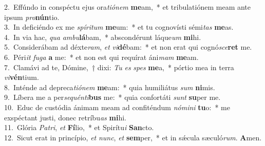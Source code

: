 {2.~}Effúndo in conspéctu ejus ora\textit{ti}\textit{ó}\textit{nem} \textbf{me}am,~* et tribulatiónem meam ante ipsum \textit{pro}\textbf{nún}tio.\\
{3.~}In deficiéndo ex me \textit{spí}\textit{ri}\textit{tum} \textbf{me}um:~* et tu cognovísti sémi\textit{tas} \textbf{me}as.\\
{4.~}In via hac, \textit{qua} \textit{am}\textit{bu}\textbf{lá}bam,~* abscondérunt láque\textit{um} \textbf{mi}hi.\\
{5.~}Considerábam ad déxte\textit{ram}, \textit{et} \textit{vi}\textbf{dé}bam:~* et non erat qui cognó\textit{sce}\textbf{ret} me.\\
{6.~}Péri\textit{it} \textit{fu}\textit{ga} \textbf{a} me:~* et non est qui requírat áni\textit{mam} \textbf{me}am.\\
{7.~}Clamávi ad te, Dómine,~† dixi: \textit{Tu} \textit{es} \textit{spes} \textbf{me}a,~* pórtio mea in terra \textit{vi}\textbf{vén}tium.\\
{8.~}Inténde ad depreca\textit{ti}\textit{ó}\textit{nem} \textbf{me}am:~* quia humiliátus \textit{sum} \textbf{ni}mis.\\
{9.~}Líbera me a per\textit{se}\textit{quén}\textit{ti}\textbf{bus} me:~* quia confortáti \textit{sunt} \textbf{su}per me.\\
{10.~}Educ de custódia ánimam meam ad confiténdum \textit{nó}\textit{mi}\textit{ni} \textbf{tu}o:~* me exspéctant justi, donec retríbu\textit{as} \textbf{mi}hi.\\
{11.~}Glória \textit{Pa}\textit{tri}, \textit{et} \textbf{Fí}lio,~* et Spirítu\textit{i} \textbf{San}cto.\\
{12.~}Sicut erat in princípio, \textit{et} \textit{nunc}, \textit{et} \textbf{sem}per,~* et in sǽcula sæculó\textit{rum}. \textbf{A}men.\\
